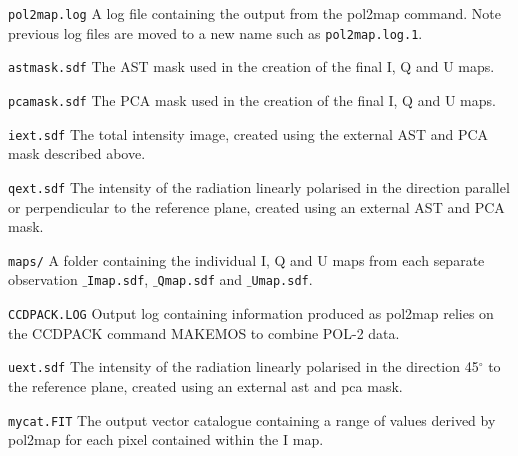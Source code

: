 \begin{aligndesc}
\item[\texttt{pol2map.log}] A log file containing the output from the
  pol2map command. Note previous log files are moved to a new name
  such as \texttt{pol2map.log.1}.

\item[\texttt{astmask.sdf}] The AST mask used in the creation
  of the final I, Q and U maps.

\item[\texttt{pcamask.sdf}] The PCA mask used in the creation of the
  final I, Q and U maps.

\item[\texttt{iext.sdf}] The total intensity image, created using the
  external AST and PCA mask described above.

\item[\texttt{qext.sdf}] The intensity of the radiation linearly
  polarised in the direction parallel or perpendicular to the
  reference plane, created using an external AST and PCA mask.

\item[\texttt{maps/}] A folder containing the individual I, Q and U
  maps from each separate observation \texttt{$\_$Imap.sdf},
  \texttt{$\_$Qmap.sdf} and \texttt{$\_$Umap.sdf}.

\item[\texttt{CCDPACK.LOG}] Output log containing information produced
  as pol2map relies on the CCDPACK command MAKEMOS to combine POL-2
  data.

\item[\texttt{uext.sdf}] The intensity of the radiation linearly
  polarised in the direction 45$^{\circ }$ to the reference plane,
  created using an external ast and pca mask.

\item[\texttt{mycat.FIT}] The output vector catalogue containing a
  range of values derived by pol2map for each pixel contained within
  the I map.

\end{aligndesc}







